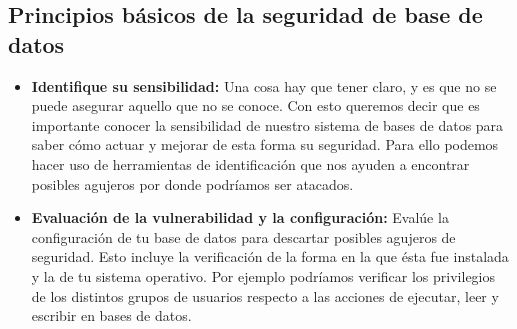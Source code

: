 \documentclass[%
 reprint,
 amsmath,amssymb,
 aps,
]{revtex4-1}
\begin{document}
\subsection{Principios básicos de la seguridad de base de datos}
\begin{itemize}
	\item \textbf{Identifique su sensibilidad: }Una cosa hay que tener claro, y es que no se puede asegurar aquello que no se conoce. Con esto queremos
decir que es importante conocer la sensibilidad de nuestro sistema de bases de datos para saber cómo
actuar y mejorar de esta forma su seguridad. Para ello podemos hacer uso de herramientas de
identificación que nos ayuden a encontrar posibles agujeros por donde podríamos ser atacados.

	\item \textbf{Evaluación de la vulnerabilidad y la configuración:} Evalúe la configuración de tu base de datos para descartar posibles agujeros de seguridad. Esto incluye la
verificación de la forma en la que ésta fue instalada y la de tu sistema operativo. Por ejemplo podríamos
verificar los privilegios de los distintos grupos de usuarios respecto a las acciones de ejecutar, leer y escribir
en bases de datos.


\end{itemize}
\end{document}
